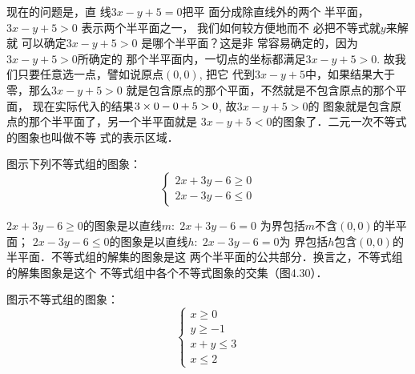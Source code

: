 现在的问题是，直
线$3x-y+5=0$把平
面分成除直线外的两个
半平面，$3x-y+5>0$
表示两个半平面之一，
我们如何较方便地而不
必把不等式就$y$来解就
可以确定$3x-y+5>0$
是哪个半平面？这是非
常容易确定的，因为
$3x-y+5>0$所确定的
那个半平面内，一切点的坐标都满足$3x-y+
5>0$. 故我们只要任意选一点，譬如说原点$(0,0)$, 把它
代到$3x-y+5$中，如果结果大于零，那么$3x-y+5>0$
就是包含原点的那个平面，不然就是不包含原点的那个平面，
现在实际代入的结果$3\times0-0+5>0$, 故$3x-y+5>0$的
图象就是包含原点的那个半平面了，另一个半平面就是
$3x-y+5<0$的图象了．二元一次不等式的图象也叫做不等
式的表示区域．

\begin{example}
图示下列不等式组的图象：
\[\begin{cases}
  2x+3y-6\ge 0\\
2x-3y-6\le 0 
\end{cases}\]
 \end{example}

\begin{solution} 
$2x+3y-6\ge 0$的图象是以直线$m:\; 2x+3y-6=0$
为界包括$m$不含$(0,0)$的半平面；
$2x-3y-6\le 0$的图象是以直线$h:\; 2x-3y-6=0$为
界包括$h$包含$(0,0)$的半平面．不等式组的解集的图象是这
两个半平面的公共部分．换言之，不等式组的解集图象是这个
不等式组中各个不等式图象的交集（图4.30）．

\begin{figure}[htp]
    \centering
{}
    \caption{}
\end{figure}
\end{solution}



\begin{example}
    图示不等式组的图象：
\[\begin{cases}
   x\ge  0\\
    y\ge -1\\
    x+y\le 3\\
    x\le 2
\end{cases}\]
\end{example}



